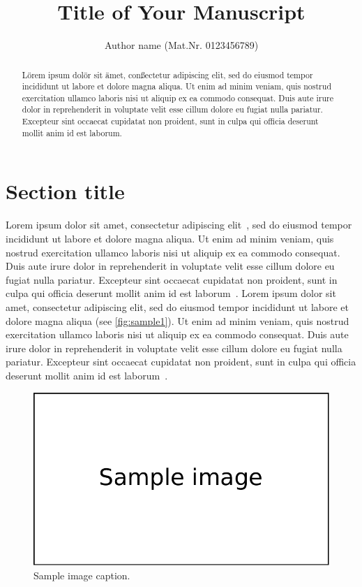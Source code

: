 \documentclass[final,nopreprintline]{elsarticle}
\begin{document}
\begin{frontmatter}

\title{Title of Your Manuscript}
\author{Author name (Mat.Nr. 0123456789)}
\address{Institute for Visual \& Analytic Computing\\University of Rostock}

\begin{abstract}
Lörem ipsum dolör sit ämet, conßectetur adipiscing elit, sed do eiusmod tempor incididunt ut labore et dolore magna aliqua. Ut enim ad minim veniam, quis nostrud exercitation ullamco laboris nisi ut aliquip ex ea commodo consequat. Duis aute irure dolor in reprehenderit in voluptate velit esse cillum dolore eu fugiat nulla pariatur. Excepteur sint occaecat cupidatat non proident, sunt in culpa qui officia deserunt mollit anim id est laborum.
\end{abstract}

\end{frontmatter}

\section{Section title}
\label{sec:sample1}

Lorem ipsum dolor sit amet, consectetur adipiscing elit~\cite{Tominski12GreatWall}, sed do eiusmod tempor incididunt ut labore et dolore magna aliqua. Ut enim ad minim veniam, quis nostrud exercitation ullamco laboris nisi ut aliquip ex ea commodo consequat. Duis aute irure dolor in reprehenderit in voluptate velit esse cillum dolore eu fugiat nulla pariatur. Excepteur sint occaecat cupidatat non proident, sunt in culpa qui officia deserunt mollit anim id est laborum~\cite{Tominski16CompaRing,Tominski17LensesExtended}.
Lorem ipsum dolor sit amet, consectetur adipiscing elit, sed do eiusmod tempor incididunt ut labore et dolore magna aliqua (see \autoref{fig:sample1}). Ut enim ad minim veniam, quis nostrud exercitation ullamco laboris nisi ut aliquip ex ea commodo consequat. Duis aute irure dolor in reprehenderit in voluptate velit esse cillum dolore eu fugiat nulla pariatur. Excepteur sint occaecat cupidatat non proident, sunt in culpa qui officia deserunt mollit anim id est laborum~\cite{Tominski20IVDA}.

\begin{figure}
\centering
\includegraphics{img/sample_image}
\caption{Sample image caption.}
\label{fig:sample1}
\end{figure}
\end{document}
